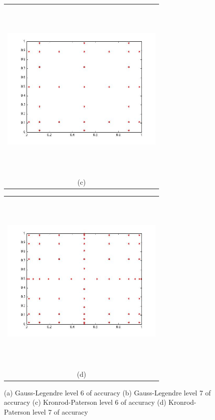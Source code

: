 \documentclass{article}
\newcommand{\Pic}[2][0.85]{\begin{center}\texttt{[image: \#2]}
 \end{center} }
\begin{document}
\begin{figure}[H]
\begin{minipage}{0.6\textwidth}
    \end{minipage} 
    \begin{minipage}[b]{0.6\textwidth}
        \begin{tabular}{c}
       \includegraphics[width=8cm,height=9cm,keepaspectratio]{fig/KPU_2_6.jpg}\\
        (c)
        \end{tabular}
    \end{minipage}
    \begin{minipage}{0.6\textwidth}
        \begin{tabular}{c}
	\includegraphics[width=8cm,height=9cm,keepaspectratio]{fig/KPU_2_7.jpg}\\
        (d)
        \end{tabular}
    \end{minipage} 
\caption{(a) Gauss-Legendre level 6 of accuracy
(b) Gauss-Legendre level 7 of accuracy
(c) Kronrod-Paterson level 6 of accuracy
(d) Kronrod-Paterson level 7 of accuracy }
\label{fig1}  
\end{figure}
\end{document}
